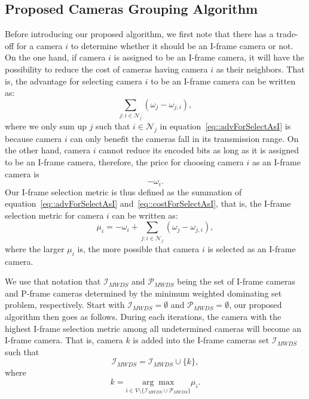 \subsection{Proposed Cameras Grouping Algorithm}
Before introducing our proposed algorithm, we first note that there has a trade-off for a camera $i$ to determine whether it should be an I-frame camera or not.
On the one hand, if camera $i$ is assigned to be an I-frame camera, it will have the possibility to reduce the cost of cameras having camera $i$ as their neighbors.
That is, the advantage for selecting camera $i$ to be an I-frame camera can be written as:
\begin{equation}
\sum_{j:i \in \mathcal{N}_j} \left( \omega_j - \omega_{j,i} \right),
\label{eq::advForSelectAsI}
\end{equation}
where we only sum up $j$ such that $i \in \mathcal{N}_j$ in equation~\eqref{eq::advForSelectAsI} is because camera $i$ can only benefit the cameras fall in its transmission range.
On the other hand, camera $i$ cannot reduce its encoded bits as long as it is assigned to be an I-frame camera, therefore, the price for choosing camera $i$ as an I-frame camera is
\begin{equation}
- \omega_i.
\label{eq::costForSelectAsI}
\end{equation}
Our I-frame selection metric is thus defined as the summation of equation~\eqref{eq::advForSelectAsI} and~\eqref{eq::costForSelectAsI}, that is, the I-frame selection metric for camera $i$ can be written as:
\begin{equation}
\mu_i = - \omega_i + \sum_{j:i \in \mathcal{N}_j} \left( \omega_j - \omega_{j,i} \right),
\label{eq::IFrameSelectionMetric}
\end{equation}
where the larger $\mu_i$ is, the more possible that camera $i$ is selected as an I-frame camera.

We use that notation that $\mathcal{I}_{MWDS}$ and $\mathcal{P}_{MWDS}$ being the set of I-frame cameras and P-frame cameras determined by the minimum weighted dominating set problem, respectively.
Start with $\mathcal{I}_{MWDS} = \emptyset$ and $\mathcal{P}_{MWDS} = \emptyset$, our proposed algorithm then goes as follows.
During each iterations, the camera with the highest I-frame selection metric among all undetermined cameras will become an I-frame camera.
That is, camera $k$ is added into the I-frame cameras set $\mathcal{I}_{MWDS}$ such that
\begin{equation}
\mathcal{I}_{MWDS} = \mathcal{I}_{MWDS} \cup \{ k \},
\label{eq::updateICamsSet}
\end{equation}
where
\begin{equation}
k = \underset{i \in V \setminus \{ \mathcal{I}_{MWDS} \cup \mathcal{P}_{MWDS} \} }{\arg \max} \mu_i.
\end{equation}

